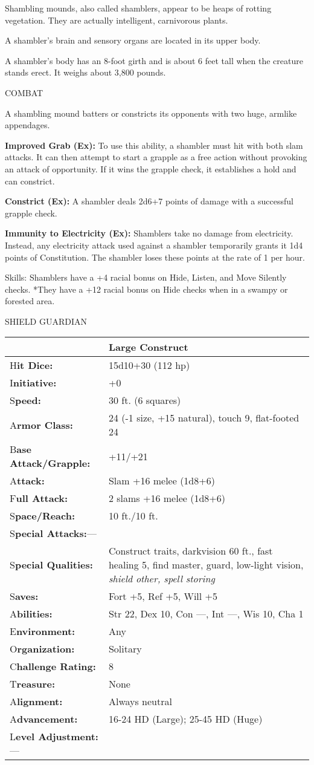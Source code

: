 \documentclass{article}
\begin{document}
Shambling mounds, also called shamblers, appear to be heaps of rotting vegetation. 
They are actually intelligent, carnivorous plants.

A shambler's brain and sensory organs are located in its upper body.

A shambler's body has an 8-foot girth and is about 6 feet tall when the creature 
stands erect. It weighs about 3,800 pounds.

COMBAT

A shambling mound batters or constricts its opponents with two huge, armlike appendages.

\textbf{Improved Grab (Ex): }To use this ability, a shambler must hit with both 
slam attacks. It can then attempt to start a grapple as a free action without provoking 
an attack of opportunity. If it wins the grapple check, it establishes a hold and 
can constrict. 

\textbf{Constrict (Ex):} A shambler deals 2d6+7 points of damage with a successful 
grapple check.

\textbf{Immunity to Electricity (Ex): }Shamblers take no damage from electricity. 
Instead, any electricity attack used against a shambler temporarily grants it 1d4 
points of Constitution. The shambler loses these points at the rate of 1 per hour.

Skills: Shamblers have a +4 racial bonus on Hide, Listen, and Move Silently checks. 
*They have a +12 racial bonus on Hide checks when in a swampy or forested area.

\vspace{12pt}
{\LARGE{}SHIELD GUARDIAN}

\begin{tabular}{|>{\raggedright}p{91pt}|>{\raggedright}p{233pt}|}
\hline
  & Large Construct\tabularnewline
\hline
H\textbf{it Dice:} & 15d10+30 (112 hp)\tabularnewline
\hline
I\textbf{nitiative:} & +0\tabularnewline
\hline
S\textbf{peed:} & 30 ft. (6 squares)\tabularnewline
\hline
A\textbf{rmor Class:} & 24 (-1 size, +15 natural), touch 9, flat-footed 24\tabularnewline
\hline
B\textbf{ase Attack/Grapple:} & +11/+21\tabularnewline
\hline
A\textbf{ttack:} & Slam +16 melee (1d8+6)\tabularnewline
\hline
F\textbf{ull Attack:} & 2 slams +16 melee (1d8+6)\tabularnewline
\hline
S\textbf{pace/Reach:} & 10 ft./10 ft.\tabularnewline
\hline
S\textbf{pecial Attacks:}--- & \tabularnewline
\hline
S\textbf{pecial Qualities:} & Construct traits, darkvision 60 ft., fast healing 
5, find master, guard, low-light vision, \textit{shield other, spell storing}\tabularnewline
\hline
S\textbf{aves:} & Fort +5, Ref +5, Will +5\tabularnewline
\hline
A\textbf{bilities:} & Str 22, Dex 10, Con ---, Int ---, Wis 10, Cha 1\tabularnewline
\hline
E\textbf{nvironment:} & Any\tabularnewline
\hline
O\textbf{rganization:} & Solitary\tabularnewline
\hline
C\textbf{hallenge Rating:} & 8\tabularnewline
\hline
T\textbf{reasure:} & None\tabularnewline
\hline
A\textbf{lignment:} & Always neutral\tabularnewline
\hline
A\textbf{dvancement:} & 16-24 HD (Large); 25-45 HD (Huge)\tabularnewline
\hline
L\textbf{evel Adjustment:}--- & \tabularnewline
\hline
\end{tabular}
\end{document}
